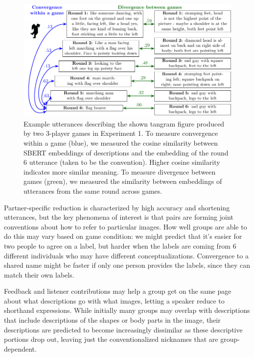 \documentclass[
  english,
  a4paper,
]{article}
\begin{document}
\begin{figure}[t!]

{\centering \includegraphics[width=1\linewidth]{sbert} 

}

\caption{Example utterances describing the shown tangram figure produced by two 3-player games in Experiment 1. To measure convergence within a game (blue), we measured the cosine similarity between SBERT embeddings of descriptions and the embedding of the round 6 utterance (taken to be the convention). Higher cosine similarity indicates more similar meaning. To measure divergence between games (green), we measured the similarity between embeddings of utterances from the same round across games.}\label{fig:sbert-diagram}
\end{figure}

Partner-specific reduction is characterized by high accuracy and shortening utterances, but the key phenomena of interest is that pairs are forming joint conventions about how to refer to particular images.
How well groups are able to do this may vary based on game condition: we might predict that it's easier for two people to agree on a label, but harder when the labels are coming from 6 different individuals who may have different conceptualizations.
Convergence to a shared name might be faster if only one person provides the labels, since they can match their own labels.

Feedback and listener contributions may help a group get on the same page about what descriptions go with what images, letting a speaker reduce to shorthand expressions.
While initially many groups may overlap with descriptions that include descriptions of the shapes or body parts in the image, their descriptions are predicted to become increasingly dissimilar as these descriptive portions drop out, leaving just the conventionalized nicknames that are group-dependent.
\end{document}
